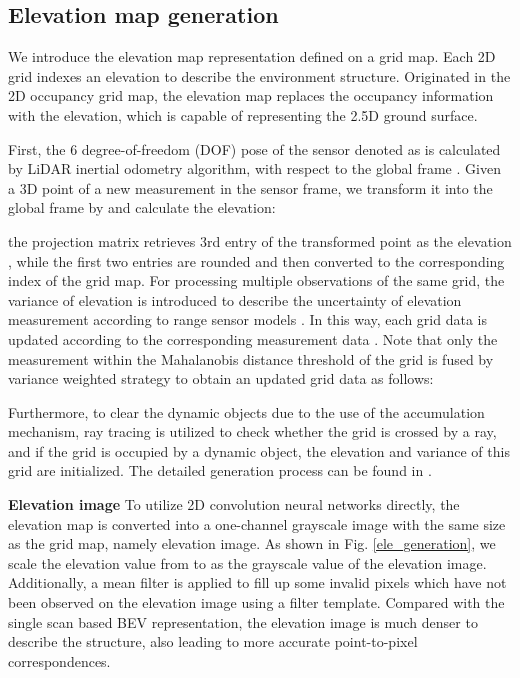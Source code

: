 \documentclass[letterpaper, 10 pt, conference]{ieeeconf}  \usepackage{tabularx}
\begin{document}
\subsection{Elevation map generation}

We introduce the elevation map representation defined on a grid map. Each 2D grid indexes an elevation to describe the environment structure. Originated in the 2D occupancy grid map, the elevation map replaces the occupancy information with the elevation, which is capable of representing the 2.5D ground surface.

First, the 6 degree-of-freedom (DOF) pose of the sensor denoted as  is calculated by LiDAR inertial odometry algorithm, with respect to the global frame . Given a 3D point  of a new measurement in the sensor frame, we transform it into the global frame by  and calculate the elevation:

the projection matrix  retrieves 3rd entry of the transformed point as the elevation , while the first two entries are rounded and then converted to the corresponding index of the grid map. For processing multiple observations of the same grid, the variance  of elevation is introduced to describe the uncertainty of elevation measurement according to range sensor models \cite{fankhauser2015kinect}. In this way, each grid data  is updated according to the corresponding measurement data . Note that only the measurement within the Mahalanobis distance threshold of the grid is fused by variance weighted strategy to obtain an updated grid data as follows:

Furthermore, to clear the dynamic objects due to the use of the accumulation mechanism, ray tracing is utilized to check whether the grid is crossed by a ray, and if the grid is occupied by a dynamic object, the elevation and variance of this grid are initialized. The detailed generation process can be found in \cite{pan2020gem}.

\textbf{Elevation image} To utilize 2D convolution neural networks directly, the elevation map is converted into a one-channel grayscale image with the same size as the grid map, namely elevation image. As shown in Fig. \ref{ele_generation}, we scale the elevation value from  to  as the grayscale value of the elevation image. Additionally, a mean filter is applied to fill up some invalid pixels which have not been observed on the elevation image using a  filter template. Compared with the single scan based BEV representation, the elevation image is much denser to describe the structure, also leading to more accurate point-to-pixel correspondences.
\end{document}
